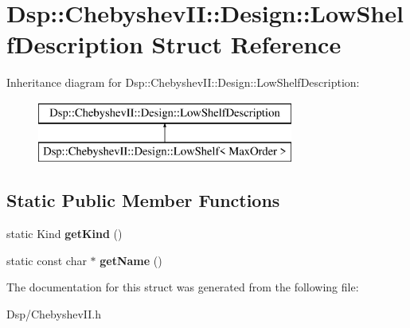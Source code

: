 \hypertarget{structDsp_1_1ChebyshevII_1_1Design_1_1LowShelfDescription}{\section{Dsp\-:\-:Chebyshev\-I\-I\-:\-:Design\-:\-:Low\-Shelf\-Description Struct Reference}
\label{structDsp_1_1ChebyshevII_1_1Design_1_1LowShelfDescription}
}
Inheritance diagram for Dsp\-:\-:Chebyshev\-I\-I\-:\-:Design\-:\-:Low\-Shelf\-Description\-:\begin{figure}[H]
\begin{center}
\leavevmode
\includegraphics[height=2.000000cm]{structDsp_1_1ChebyshevII_1_1Design_1_1LowShelfDescription}
\end{center}
\end{figure}
\subsection*{Static Public Member Functions}
\begin{DoxyCompactItemize}
\item 
\hypertarget{structDsp_1_1ChebyshevII_1_1Design_1_1LowShelfDescription_aa1197de56afc65fe7dba3f1db427536f}{static Kind {\bfseries get\-Kind} ()}\label{structDsp_1_1ChebyshevII_1_1Design_1_1LowShelfDescription_aa1197de56afc65fe7dba3f1db427536f}

\item 
\hypertarget{structDsp_1_1ChebyshevII_1_1Design_1_1LowShelfDescription_a6f945b65be5d697bd0e8520d6338e47d}{static const char $\ast$ {\bfseries get\-Name} ()}\label{structDsp_1_1ChebyshevII_1_1Design_1_1LowShelfDescription_a6f945b65be5d697bd0e8520d6338e47d}

\end{DoxyCompactItemize}


The documentation for this struct was generated from the following file\-:\begin{DoxyCompactItemize}
\item 
Dsp/Chebyshev\-I\-I.\-h\end{DoxyCompactItemize}
